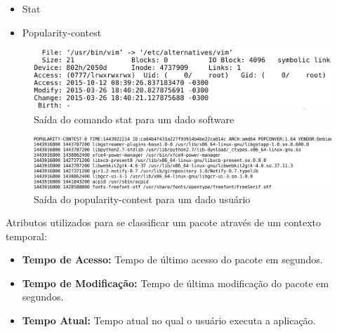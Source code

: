 \begin{frame}

    \begin{itemize}
        \item Stat
        \item Popularity-contest
    \end{itemize}

\end{frame}

\begin{frame}
\begin{figure}[h!]
    \centering
    \includegraphics[width=1\textwidth]{figura/comando_stat.eps}
    \caption{Saída do comando stat para um dado software}
\end{figure}
\end{frame}


\begin{frame}
\begin{figure}[h!]
    \centering
    \includegraphics[width=1\textwidth]{figura/popularity_contest.eps}
    \caption{Saída do popularity-contest para um dado usuário}
\end{figure}
\end{frame}


\begin{frame}

    Atributos utilizados para se classificar um pacote através
    de um contexto temporal:

    \begin{itemize}
        \item \textbf{Tempo de Acesso:} Tempo de último acesso do pacote
        em segundos.

        \item \textbf{Tempo de Modificação:} Tempo de última modificação
        do pacote em segundos.

        \item \textbf{Tempo Atual:} Tempo atual no qual o usuário executa
        a aplicação.
    \end{itemize}

\end{frame}


